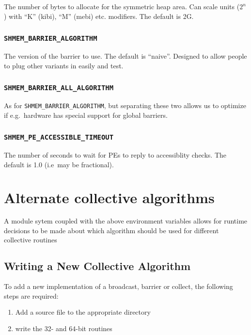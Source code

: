 \documentclass[english]{article}
\begin{document}
The number of bytes to allocate for the symmetric heap area. Can scale
units ($2^n$) with ``K'' (kibi), ``M'' (mebi) etc. modifiers. The default is 2G.

\subsubsection*{\texttt{SHMEM\_BARRIER\_ALGORITHM}}

The version of the barrier to use. The default is ``naive''. Designed
to allow people to plug other variants in easily and test.

\subsubsection*{\texttt{SHMEM\_BARRIER\_ALL\_ALGORITHM}}

As for \texttt{SHMEM\_BARRIER\_ALGORITHM}, but separating these two
allows us to optimize if e.g.\ hardware has special support for global
barriers.

\subsubsection*{\texttt{SHMEM\_PE\_ACCESSIBLE\_TIMEOUT}}

The number of seconds to wait for PEs to reply to accessiblity
checks. The default is 1.0 (i.e\ may be fractional).

\section{Alternate collective algorithms}

A module sytem coupled with the above environment variables allows for
runtime decisions to be made about which algorithm should be used for
different collective routines

\subsection{Writing a New Collective Algorithm}

To add a new implementation of a broadcast, barrier or collect, the
following steps are required:

\begin{enumerate}
\item Add a source file to the appropriate directory
\item write the 32- and 64-bit routines
\end{enumerate}
\end{document}

